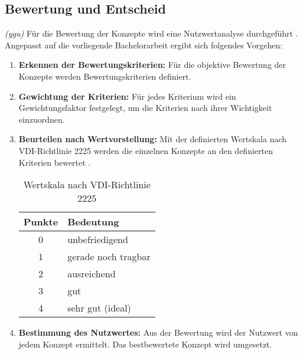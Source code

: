 \subsection{Bewertung und Entscheid}
\textit{(ygu)} Für die Bewertung der Konzepte wird eine Nutzwertanalyse durchgeführt \cite{naefe}. Angepasst auf die vorliegende Bachelorarbeit ergibt sich folgendes Vorgehen:

\begin{enumerate}
	\item \textbf{Erkennen der Bewertungskriterien:} Für die objektive Bewertung der Konzepte werden Bewertungskriterien definiert.
	
	\item \textbf{Gewichtung der Kriterien:} Für jedes Kriterium wird ein Gewichtungsfaktor festgelegt, um die Kriterien nach ihrer Wichtigkeit einzuordnen.
	
	\item \textbf{Beurteilen nach Wertvorstellung:} Mit der definierten Wertskala nach VDI-Richtlinie 2225 werden die einzelnen Konzepte an den definierten Kriterien bewertet \cite{vdi2225}.

\begin{table}[H]
	\begin{tabular}{|c|l|}
		\hline 
		\textbf{Punkte} & \textbf{Bedeutung} \\ 
		\hline 
		0 & unbefriedigend \\ 
		\hline 
		1 & gerade noch tragbar \\ 
		\hline 
		2 & ausreichend \\ 
		\hline 
		3 & gut \\ 
		\hline 
		4 & sehr gut (ideal) \\ 
		\hline 
	\end{tabular} 
	\caption{Wertskala nach VDI-Richtlinie 2225}
	\label{tab:wertskala}
\end{table}	
	
	
	\item \textbf{Bestimmung des Nutzwertes:} Aus der Bewertung wird der Nutzwert von jedem Konzept ermittelt. Das bestbewertete Konzept wird umgesetzt.
\end{enumerate}

